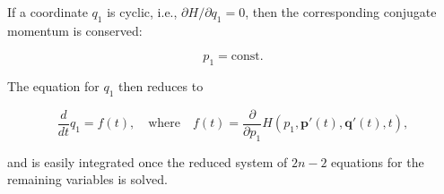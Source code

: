 If a coordinate $q_1$ is cyclic, i.e., $\partial H/\partial q_1 = 0$, then the corresponding conjugate momentum is conserved:

$$p_1 = \text{const}.$$

The equation for $q_1$ then reduces to

$$\frac{d}{dt} q_1 = f(t), \quad \text{where} \quad f(t) = \frac{\partial}{\partial p_1} H(p_1, \mathbf{p}'(t), \mathbf{q}'(t), t),$$

and is easily integrated once the reduced system of $2n-2$ equations for the remaining variables is solved.